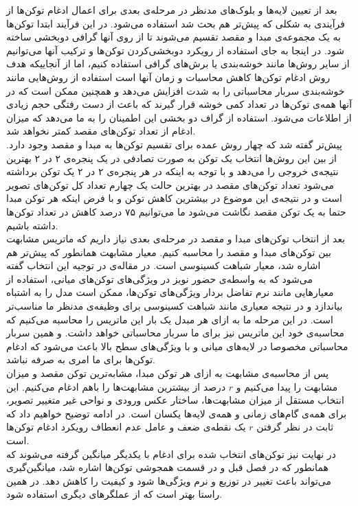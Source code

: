 بعد از تعیین لایه‌ها و بلوک‌های مدنظر در مرحله‌ی بعدی برای اعمال ادغام توکن‌ها از فرآیندی به شکلی که پیش‌تر هم بحث شد استفاده می‌شود. در این فرآیند ابتدا توکن‌ها به یک مجموعه‌ی مبدا و مقصد تقسیم می‌شوند تا از روی آنها گرافی دوبخشی ساخته‌ شود. در اینجا به جای استفاده از رویکرد دوبخشی‌کردن توکن‌ها و ترکیب آنها می‌توانیم از سایر روش‌ها مانند خوشه‌بندی یا برش‌های گرافی استفاده کنیم، اما از آنجاییکه هدف روش ادغام توکن‌ها کاهش محاسبات و زمان آنها است استفاده از روش‌هایی مانند خوشه‌بندی سربار محاسباتی را به شدت افزایش می‌دهد و همچنین ممکن است که در آنها همه‌ی توکن‌ها در تعداد کمی خوشه قرار گیرند که باعث از دست رفتگی حجم زیادی از اطلاعات می‌شود. استفاده از گراف دو بخشی این اطمینان را به ما می‌دهد که میزان ادغام از تعداد توکن‌های مقصد کمتر نخواهد شد. 
\\
پیش‌تر گفته شد که چهار روش عمده برای تقسیم توکن‌ها به مبدا و مقصد وجود دارد. از بین این روش‌ها انتخاب یک توکن به صورت تصادفی در یک پنجره‌ی ۲ در ۲ بهترین نتیجه‌ی خروجی را می‌دهد و با توجه به اینکه در هر پنجره‌ی ۲ در ۲ یک توکن برداشته می‌شود تعداد توکن‌های مقصد در بهترین حالت یک چهارم تعداد کل توکن‌های تصویر است و در نتیجه‌ی این موضوع در بیشترین کاهش توکن و با فرض اینکه هر توکن مبدا حتما به یک توکن مقصد نگاشت می‌شود ما می‌توانیم ۷۵ درصد کاهش در تعداد توکن‌ها داشته باشیم.
\\ 
بعد از انتخاب توکن‌های مبدا و مقصد در مرحله‌ی بعدی نیاز داریم که ماتریس مشابهت بین توکن‌های مبدا و مقصد را محاسبه کنیم. معیار مشابهت همانطور که پیش‌تر هم اشاره شد، معیار شباهت کسینوسی است. در مقاله‌ی \cite{bolya2022token} در توجیه این انتخاب گفته می‌شود که به واسطه‌ی حضور نویز در ویژگی‌های توکن‌های میانی، استفاده از معیارهایی مانند نرم تفاضل بردار ویژگی‌های توکن‌ها، ممکن است مدل را به اشتباه بیاندازد و در نتیجه معیاری مانند شباهت کسینوسی برای وظیفه‌ی مدنظر ما مناسب‌تر است. در این مرحله ما به ازای هر مبدل یک بار این ماتریس را محاسبه می‌کنیم که محاسبه‌ی خود این ماتریس نیز برای ما سربار محاسباتی خواهد داشت. و همین سربار محاسباتی مخصوصا در لایه‌های میانی و با ویژگی‌های سطح بالا باعث می‌شود که ادغام توکن‌ها برای ما امری به صرفه نباشد.
\\
پس از محاسبه‌ی مشابهت به ازای هر توکن مبدا، مشابه‌ترین توکن مقصد و میزان مشابهت را پیدا می‌کنیم و $r$ درصد از بیشترین مشابهت‌ها را باهم ادغام می‌کنیم. این انتخاب مستقل از میزان مشابهت‌ها، ساختار عکس ورودی و نواحی غیر متغییر تصویر، برای همه‌ی گام‌های زمانی و همه‌ی لایه‌ها یکسان است. در ادامه توضیح خواهیم داد که ثابت در نظر گرفتن $r$ یک نقطه‌ی ضعف و عامل عدم انعطاف رویکرد ادغام توکن‌ها است.
\\
در نهایت نیز توکن‌های انتخاب شده برای ادغام با یکدیگر میانگین گرفته می‌شوند که همانطور که در فصل قبل و در قسمت همجوشی توکن‌ها اشاره شد، میانگین‌گیری می‌تواند باعث تغییر در توزیع و نرم ویژگی‌ها شود و کیفیت را کاهش دهد. در همین راستا بهتر است که از عملگر‌های دیگری استفاده شود.
